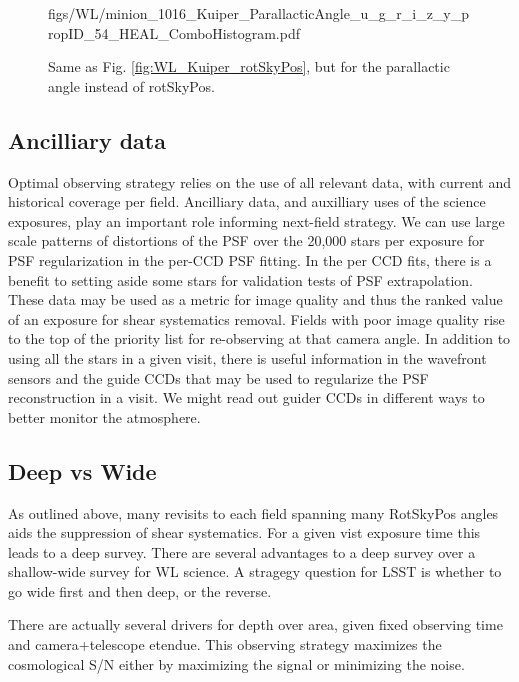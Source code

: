 \begin{figure}[tbh!]
        {figs/WL/minion_1016_Kuiper_ParallacticAngle_u_g_r_i_z_y_propID_54_HEAL_ComboHistogram.pdf}
\caption{Same as Fig. \ref{fig:WL_Kuiper_rotSkyPos}, but for the parallactic
    angle instead of rotSkyPos.}
\label{fig:WL_Kuiper_ParallacticAngle}
\end{figure}


\subsection{Ancilliary data}

Optimal observing strategy relies on the use of all relevant data, with current
and historical coverage per field.  Ancilliary data, and auxilliary uses of the
science exposures, play an important role informing next-field strategy.  We can
use large scale patterns of distortions of the PSF over the 20,000 stars per
exposure for PSF regularization in the per-CCD PSF fitting.  In the per CCD fits,
there is a benefit to setting aside some stars for validation tests of PSF
extrapolation.  These data may be used as a metric for image quality and thus
the ranked value of an exposure for shear systematics removal.  Fields with poor
image quality rise to the top of the priority list for re-observing at that
camera angle.  In addition to using all the stars in a given visit, there is
useful information in the wavefront sensors and the guide CCDs that may be used
to regularize the PSF reconstruction in a visit.  We might read out guider CCDs
in different ways to better monitor the atmosphere.

\subsection{Deep vs Wide}

As outlined above, many revisits to each field spanning many RotSkyPos angles
aids the suppression  of shear systematics.  For a given vist exposure time this
leads to a deep survey.  There are several advantages to a deep survey over a
shallow-wide survey for WL science.  A stragegy question for LSST is whether to
go wide first and then deep, or the reverse.

There are actually several drivers for depth over area, given fixed observing
time and camera+telescope etendue.  This observing strategy maximizes the
cosmological S/N either by maximizing the signal or minimizing the noise.

